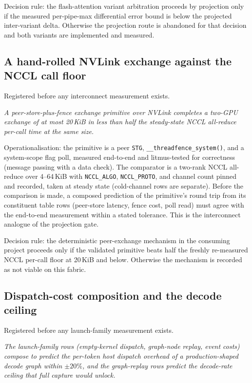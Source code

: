 Decision rule: the flash-attention variant arbitration proceeds by
projection only if the measured per-pipe-max differential error bound is
below the projected inter-variant delta. Otherwise the projection route is
abandoned for that decision and both variants are implemented and measured.

\subsection{A hand-rolled NVLink exchange against the NCCL call floor}
\label{sec:hyp-exchange}

Registered before any interconnect measurement exists.

\emph{A peer-store-plus-fence exchange primitive over NVLink completes a
two-GPU exchange of at most 20\,KiB in less than half the steady-state
NCCL all-reduce per-call time at the same size.}

Operationalisation: the primitive is a peer \texttt{STG},
\texttt{\_\_threadfence\_system()}, and a system-scope flag poll, measured
end-to-end and litmus-tested for correctness (message passing with a data
check). The comparator is a two-rank NCCL all-reduce over 4--64\,KiB with
\texttt{NCCL\_ALGO}, \texttt{NCCL\_PROTO}, and channel count pinned and
recorded, taken at steady state (cold-channel rows are separate). Before
the comparison is made, a composed prediction of the primitive's round
trip from its constituent table rows (peer-store latency, fence cost, poll
read) must agree with the end-to-end measurement within a stated
tolerance. This is the interconnect analogue of the projection gate.

Decision rule: the deterministic peer-exchange mechanism in the consuming
project proceeds only if the validated primitive beats half the freshly
re-measured NCCL per-call floor at 20\,KiB and below. Otherwise the
mechanism is recorded as not viable on this fabric.

\subsection{Dispatch-cost composition and the decode ceiling}
\label{sec:hyp-dispatch}

Registered before any launch-family measurement exists.

\emph{The launch-family rows (empty-kernel dispatch, graph-node replay,
event costs) compose to predict the per-token host dispatch overhead of a
production-shaped decode graph within \(\pm20\%\), and the graph-replay
rows predict the decode-rate ceiling that full capture would unlock.}

